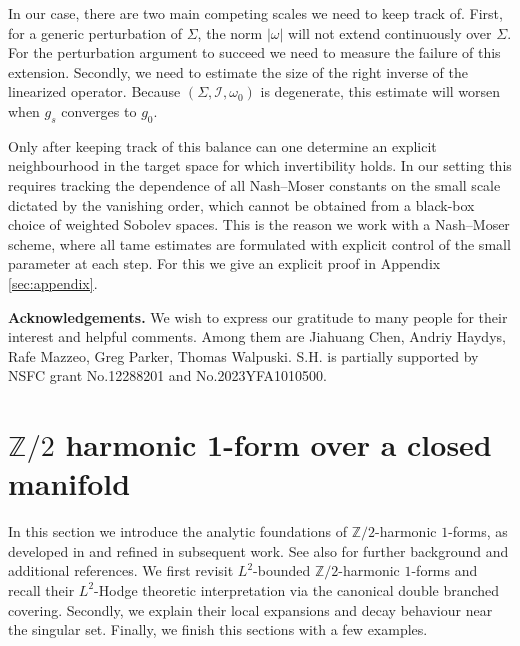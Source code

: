 \documentclass[11pt]{amsart}
\newcommand{\ZT}{\mathbb{Z}/2}
\begin{document}
In our case, there are two main competing scales we need to keep track of. First, for a generic perturbation of $\Sigma$, the norm $|\omega|$ will not extend continuously over $\Sigma$. For the perturbation argument to succeed we need to measure the failure of this extension. Secondly, we need to estimate the size of the right inverse of the linearized operator. Because \((\Sigma,\mathcal{I},\omega_0)\) is degenerate, this estimate will worsen when $g_s$ converges to $g_0$.

Only after keeping track of this balance can one determine an explicit neighbourhood in the target space for which invertibility holds.
In our setting this requires tracking the dependence of all Nash--Moser constants on the small scale dictated by the vanishing order, which cannot be obtained from a black-box choice of weighted Sobolev spaces.
This is the reason we work with a Nash--Moser scheme, where all tame estimates are formulated with explicit control of the small parameter at each step. For this we give an explicit proof in Appendix \ref{sec:appendix}.

\textbf{Acknowledgements.} We wish to express our gratitude to many people for their interest and helpful comments. Among them are Jiahuang Chen, Andriy Haydys, Rafe Mazzeo, Greg Parker, Thomas Walpuski. S.H. is partially supported by NSFC grant No.12288201 and No.2023YFA1010500.

\section{\texorpdfstring{$\ZT$}{Z/2} harmonic 1-form over a closed manifold}
In this section we introduce the analytic foundations of \(\ZT\)-harmonic \(1\)-forms,
as developed in \cite{Donaldson2021,Tau13a} and refined in subsequent work. See also \cite{BeraWalpuski2025Dirac,MazzeoHaydysTakahashi} for further background and additional references. We first revisit \(L^2\)-bounded \(\ZT\)-harmonic \(1\)-forms and recall their \(L^2\)-Hodge theoretic interpretation via the canonical double branched covering. Secondly, we explain their local expansions and decay behaviour near the singular set. Finally, we finish this sections with a few examples.
\end{document}
